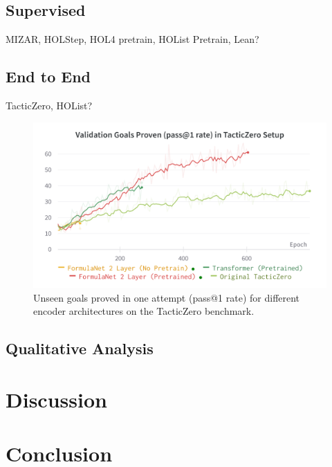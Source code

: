 \documentclass[letterpaper]{article} %
\begin{document}
    \subsection{Supervised}


    MIZAR, HOLStep, HOL4 pretrain, HOList Pretrain, Lean?

    \subsection{End to End}
    TacticZero, HOList?

    \begin{figure}[h]
        \centering
        \includegraphics[width=\linewidth]{tz_plot.png}
        \caption{Unseen goals proved in one attempt (pass@1 rate) for different encoder architectures on the TacticZero benchmark.}
        \label{fig:tz_plot}
    \end{figure}

    \subsection{Qualitative Analysis}


    \section{Discussion}


    \section{Conclusion}
\end{document}
